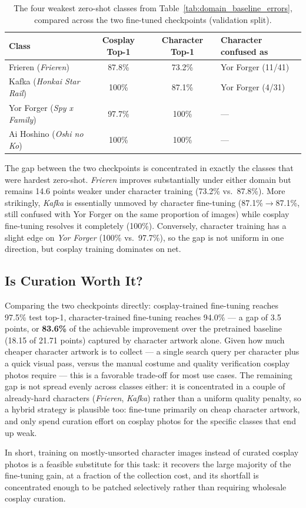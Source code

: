 \begin{table}[H]
\centering
\begin{tabular}{lccl}
\toprule
\textbf{Class} & \textbf{Cosplay Top-1} & \textbf{Character Top-1} & \textbf{Character confused as} \\
\midrule
Frieren (\textit{Frieren})         & 87.8\%  & 73.2\%  & Yor Forger (11/41) \\
Kafka (\textit{Honkai Star Rail})  & 100\%   & 87.1\%  & Yor Forger (4/31) \\
Yor Forger (\textit{Spy x Family}) & 97.7\%  & 100\%   & --- \\
Ai Hoshino (\textit{Oshi no Ko})   & 100\%   & 100\%   & --- \\
\bottomrule
\end{tabular}
\caption{The four weakest zero-shot classes from
Table~\ref{tab:domain_baseline_errors}, compared across the two fine-tuned
checkpoints (validation split).}
\label{tab:domain_finetune_errors}
\end{table}

The gap between the two checkpoints is concentrated in exactly the classes
that were hardest zero-shot. \textit{Frieren} improves substantially under
either domain but remains 14.6 points weaker under character training
(73.2\% vs.\ 87.8\%). More strikingly, \textit{Kafka} is essentially unmoved
by character fine-tuning (87.1\%$\to$87.1\%, still confused with Yor Forger
on the same proportion of images) while cosplay fine-tuning resolves it
completely (100\%). Conversely, character training has a slight edge on
\textit{Yor Forger} (100\% vs.\ 97.7\%), so the gap is not uniform in one
direction, but cosplay training dominates on net.

\subsection{Is Curation Worth It?}

Comparing the two checkpoints directly: cosplay-trained fine-tuning reaches
97.5\% test top-1, character-trained fine-tuning reaches 94.0\% --- a gap of
3.5 points, or \textbf{83.6\%} of the achievable improvement over the
pretrained baseline (18.15 of 21.71 points) captured by character artwork
alone. Given how much cheaper character artwork is to collect --- a single
search query per character plus a quick visual pass, versus the manual
costume and quality verification cosplay photos require --- this is a
favorable trade-off for most use cases. The remaining gap is not spread
evenly across classes either: it is concentrated in a couple of already-hard
characters (\textit{Frieren}, \textit{Kafka}) rather than a uniform quality
penalty, so a hybrid strategy is plausible too: fine-tune primarily on cheap
character artwork, and only spend curation effort on cosplay photos for the
specific classes that end up weak.

In short, training on mostly-unsorted character images instead of curated
cosplay photos is a feasible substitute for this task: it recovers the large
majority of the fine-tuning gain, at a fraction of the collection cost, and
its shortfall is concentrated enough to be patched selectively rather than
requiring wholesale cosplay curation.
